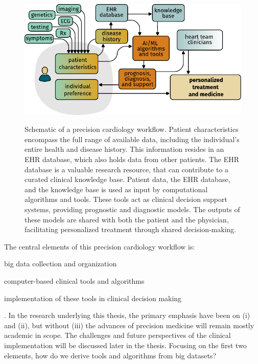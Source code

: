\begin{figure}[bth]
    \vspace{1em}
    \caption[Schematic of Precision Cardiology]{%
    Schematic of a precision cardiology workflow.
    Patient characteristics encompass the full range of available data,
    including the individual's entire health and disease history.
    This information resides in an \ac{EHR} database, 
    which also holds data from other patients. 
    The \ac{EHR} database is a valuable research resource, 
    that can contribute to a curated clinical knowledge base. 
    Patient data, the \ac{EHR} database, 
    and the knowledge base is used as input 
    by computational algorithms and tools. 
    These tools act as clinical decision support systems, 
    providing prognostic and diagnostic models. 
    The outputs of these models 
    are shared with both the patient and the physician, 
    facilitating personalized treatment 
    through shared decision-making.%
    }
	\includegraphics{graphics/precision-cardiology}
    \label{fig:precision-cardiology}
    \vspace{-3em}
\end{figure}

The central elements of this precision cardiology workflow is:
\begin{enumerate*}
    \item big data collection and organization
    \item computer-based clinical tools and algorithms
    \item implementation of these tools in clinical decision making
\end{enumerate*}.
In the research underlying this thesis, 
the primary emphasis have been on (i) and (ii),
but without (iii) the advances of precision medicine
will remain mostly academic in scope.
The challenges and future perspectives of the clinical implementation
will be discussed later in the thesis.
Focusing on the first two elements, 
how do we derive tools and algorithms from big datasets?

